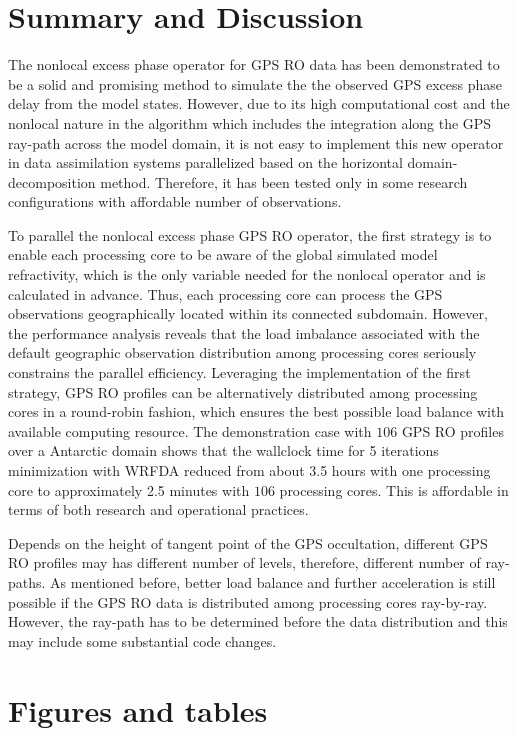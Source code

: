 \documentclass[12pt]{article}
\begin{document}
\section{Summary and Discussion}
\label{sec:end}
The nonlocal excess phase operator for GPS RO data has been demonstrated to be a solid and promising method to simulate the the observed GPS excess phase delay from the model states. However, due to its high computational cost and the nonlocal nature in the algorithm which includes the integration along the GPS ray-path across the model domain, it is not easy to implement this new operator in data assimilation systems parallelized based on the horizontal domain-decomposition method. Therefore, it has been tested only in some research configurations with affordable number of observations.

To parallel the nonlocal excess phase GPS RO operator, the first strategy is to enable each processing core to be aware of the global simulated model refractivity, which is the only variable needed for the nonlocal operator and is calculated in advance. Thus, each processing core can process the GPS observations geographically located within its connected subdomain. However, the performance analysis reveals that the load imbalance associated with the default geographic observation distribution among processing cores seriously constrains the parallel efficiency. Leveraging the implementation of the first strategy, GPS RO profiles can be alternatively distributed among processing cores in a round-robin fashion, which ensures the best possible load balance with available computing resource. The demonstration case with $106$ GPS RO profiles over a Antarctic domain shows that the wallclock time for 5 iterations minimization with WRFDA reduced from about 3.5 hours with one processing core to approximately 2.5 minutes with $106$ processing cores. This is affordable in terms of both research and operational practices.

Depends on the height of tangent point of the GPS occultation, different GPS RO profiles may has different number of levels, therefore, different number of ray-paths. As mentioned before, better load balance and further acceleration is still possible if the GPS RO data is distributed among processing cores ray-by-ray. However, the ray-path has to be determined before the data distribution and this may include some substantial code changes.


\section{Figures and tables}
\end{document}
